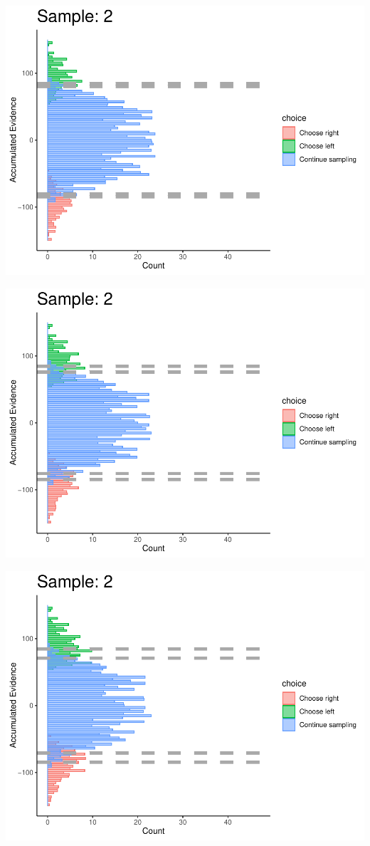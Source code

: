 \documentclass[
]{book}
\begin{document}
\begin{center}\includegraphics[width=0.8\linewidth]{LateNightBayes_files/figure-latex/collapsing_check-17} \end{center}

\begin{center}\includegraphics[width=0.8\linewidth]{LateNightBayes_files/figure-latex/collapsing_check-18} \end{center}

\begin{center}\includegraphics[width=0.8\linewidth]{LateNightBayes_files/figure-latex/collapsing_check-19} \end{center}
\end{document}
